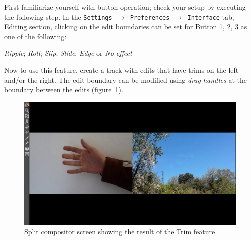First familiarize yourself with button operation; check your setup by executing the following step.  In the \texttt{Settings $\rightarrow$ Preferences $\rightarrow$ Interface} tab, Editing section, clicking on the edit boundaries can be set for Button 1, 2, 3 as one of the following:

\textit{Ripple}; \textit{Roll}; \textit{Slip}; \textit{Slide}; \textit{Edge} or \textit{No effect}

Now to use this feature, create a track with edits that have trims on the left and/or the right. The edit boundary can be modified using \textit{drag handles} at the boundary between the edits (figure~\ref{fig:trim-display}).
\begin{figure}[htpb]
    \centering
    \includegraphics[width=0.9\linewidth]{images/trim-display.png}
    \caption{Split compositor screen showing the result of the Trim feature}
    \label{fig:trim-display}
\end{figure}

